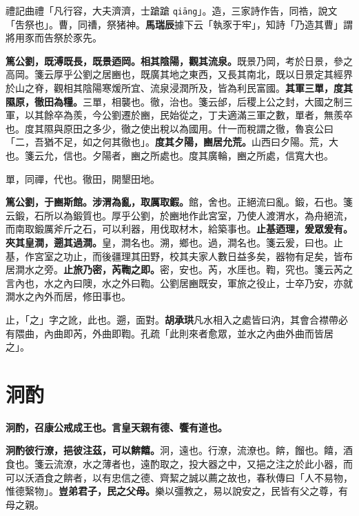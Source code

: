 \begin{quoting}禮記曲禮「凡行容，大夫濟濟，士蹌蹌 \texttt{qiāng}」。造，三家詩作告，同祰，說文「吿祭也」。曹，同䄚，祭猪神。\textbf{馬瑞辰}據下云「執豕于牢」，知詩「乃造其曹」謂將用豕而告祭於豕先。\end{quoting}

\textbf{篤公劉，既溥既長，既景迺岡。相其陰陽，觀其流泉。}{\footnotesize 既景乃岡，考於日景，參之高岡。箋云厚乎公劉之居豳也，既廣其地之東西，又長其南北，既以日景定其經界於山之脊，觀相其陰陽寒煖所宜、流泉浸潤所及，皆為利民富國。}\textbf{其軍三單，度其隰原，徹田為糧。}{\footnotesize 三單，相襲也。徹，治也。箋云邰，后稷上公之封，大國之制三軍，以其餘卒為羨，今公劉遷於豳，民始從之，丁夫適滿三軍之數，單者，無羨卒也。度其隰與原田之多少，徹之使出稅以為國用。什一而稅謂之徹，魯哀公曰「二，吾猶不足，如之何其徹也」。}\textbf{度其夕陽，豳居允荒。}{\footnotesize 山西曰夕陽。荒，大也。箋云允，信也。夕陽者，豳之所處也。度其廣輪，豳之所處，信寬大也。}

\begin{quoting}單，同禪，代也。徹田，開墾田地。\end{quoting}

\textbf{篤公劉，于豳斯館。涉渭為亂，取厲取鍜。}{\footnotesize 館，舍也。正絕流曰亂。鍛，石也。箋云鍛，石所以為鍛質也。厚乎公劉，於豳地作此宮室，乃使人渡渭水，為舟絕流，而南取鍛厲斧斤之石，可以利器，用伐取材木，給築事也。}\textbf{止基迺理，爰眾爰有。夾其皇澗，遡其過澗。}{\footnotesize 皇，澗名也。溯，鄉也。過，澗名也。箋云爰，曰也。止基，作宮室之功止，而後疆理其田野，校其夫家人數日益多矣，器物有足矣，皆布居澗水之旁。}\textbf{止旅乃密，芮鞫之即。}{\footnotesize 密，安也。芮，水厓也。鞫，究也。箋云芮之言內也，水之內曰隩，水之外曰鞫。公劉居豳既安，軍旅之役止，士卒乃安，亦就澗水之內外而居，修田事也。}

\begin{quoting}止，「之」字之訛，此也。遡，面對。\textbf{胡承珙}凡水相入之處皆曰汭，其會合襟帶必有隈曲，內曲即芮，外曲即鞫。孔疏「此則來者愈眾，並水之內曲外曲而皆居之」。\end{quoting}

\section{泂酌}


\textbf{泂酌，召康公戒成王也。言皇天親有德、饗有道也。}

\textbf{泂酌彼行潦，挹彼注茲，可以餴饎。}{\footnotesize 泂，遠也。行潦，流潦也。餴，餾也。饎，酒食也。箋云流潦，水之薄者也，遠酌取之，投大器之中，又挹之注之於此小器，而可以沃酒食之餴者，以有忠信之德、齊絜之誠以薦之故也，春秋傳曰「人不易物，惟德繄物」。}\textbf{豈弟君子，民之父母。}{\footnotesize 樂以彊教之，易以說安之，民皆有父之尊，有母之親。}

